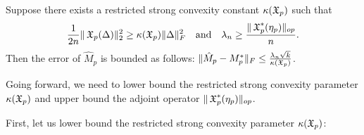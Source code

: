
\begin{lemma}
\label{lem:lowRank}
Suppose there exists a restricted strong convexity constant $\kappa(\operatorname{\mathfrak{X}}_p)$ such that
$$\frac{1}{2n} \| \operatorname{\mathfrak{X}}_p( \Delta )\|_2^2 \ge \kappa(\operatorname{\mathfrak{X}}_p) \|\Delta\|^2_F \quad \text{and} \quad
\lambda_n \ge \frac{\|\operatorname{\mathfrak{X}}_p^*(\eta_p)\|_{op}}{n}.$$
Then the error of $\hat M_p$ is bounded as follows:
$\| \hat M_p - M_p^* \|_F \le \frac{\lambda_n \sqrt{k}}{\kappa(\operatorname{\mathfrak{X}}_p)}$.
\end{lemma}

Going forward, we need to lower bound the restricted strong convexity
parameter $\kappa(\operatorname{\mathfrak{X}}_p)$ and upper bound the adjoint operator
$\|\operatorname{\mathfrak{X}}_p^*(\eta_p)\|_{op}$.



First, let us lower bound the restricted strong convexity parameter $\kappa(\operatorname{\mathfrak{X}}_p)$:


